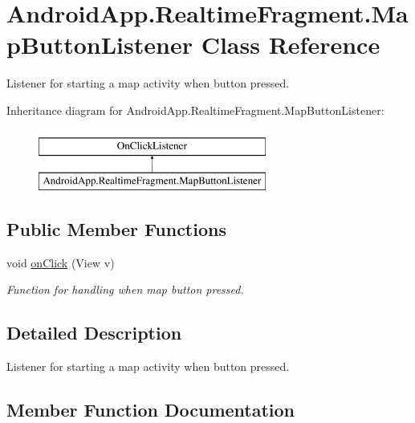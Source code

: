 \hypertarget{class_android_app_1_1_realtime_fragment_1_1_map_button_listener}{}\section{Android\+App.\+Realtime\+Fragment.\+Map\+Button\+Listener Class Reference}
\label{class_android_app_1_1_realtime_fragment_1_1_map_button_listener}


Listener for starting a map activity when button pressed.  


Inheritance diagram for Android\+App.\+Realtime\+Fragment.\+Map\+Button\+Listener\+:\begin{figure}[H]
\begin{center}
\leavevmode
\includegraphics[height=2.000000cm]{class_android_app_1_1_realtime_fragment_1_1_map_button_listener}
\end{center}
\end{figure}
\subsection*{Public Member Functions}
\begin{DoxyCompactItemize}
\item 
void \hyperlink{class_android_app_1_1_realtime_fragment_1_1_map_button_listener_ad7242a00f24a6ed739742d0fdcb80676}{on\+Click} (View v)
\begin{DoxyCompactList}\small\item\em Function for handling when map button pressed. \end{DoxyCompactList}\end{DoxyCompactItemize}


\subsection{Detailed Description}
Listener for starting a map activity when button pressed. 

\subsection{Member Function Documentation}
\mbox{\label{class_android_app_1_1_realtime_fragment_1_1_map_button_listener_ad7242a00f24a6ed739742d0fdcb80676}} 
